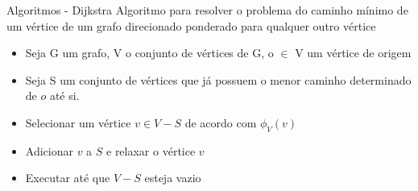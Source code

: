 \begin{frame}{Algoritmos - Dijkstra}
    Algoritmo para resolver o problema do caminho mínimo de um vértice de um grafo direcionado ponderado para qualquer outro vértice \cite{cormen2022introduction}
    \vspace{\baselineskip}
    \begin{itemize}
        \item Seja G um grafo, V o conjunto de vértices de G, o $\in$ V um vértice de origem
        \item Seja S um conjunto de vértices que já possuem o menor caminho determinado de $o$ até si.
        \item Selecionar um vértice $v \in V-S$ de acordo com $\phi_V(v)$
        \item Adicionar $v$ a $S$ e relaxar o vértice $v$
        \item Executar até que $V-S$ esteja vazio
    \end{itemize}
\end{frame}